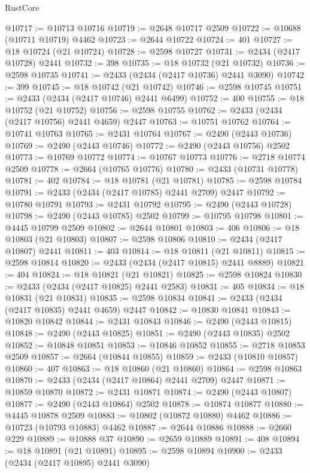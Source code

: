 \begin{lexlean}{RustCore}
\begin{coremodule}
@10717 := @10713 @10716
@10719 := @2648 @10717 @2509
@10722 := @10688 (@10711 @10719) @4462
@10723 := @2644 @10722
@10724 := 401
@10727 := @18 @10724 (@21 @10724)
@10728 := @2598 @10727
@10731 := @2434 (@2417 @10728) @2441
@10732 := 398
@10735 := @18 @10732 (@21 @10732)
@10736 := @2598 @10735
@10741 := @2433 (@2434 (@2417 @10736) @2441 @3090)
@10742 := 399
@10745 := @18 @10742 (@21 @10742)
@10746 := @2598 @10745
@10751 := @2433 (@2434 (@2417 @10746) @2441 @6499)
@10752 := 400
@10755 := @18 @10752 (@21 @10752)
@10756 := @2598 @10755
@10762 := @2433 (@2434 (@2417 @10756) @2441 @4659) @2447
@10763 := @10751 @10762
@10764 := @10741 @10763
@10765 := @2431 @10764
@10767 := @2490 (@2443 @10736)
@10769 := @2490 (@2443 @10746)
@10772 := @2490 (@2443 @10756) @2502
@10773 := @10769 @10772
@10774 := @10767 @10773
@10776 := @2718 @10774 @2509
@10778 := @2664 (@10765 @10776)
@10780 := @2433 (@10731 @10778)
@10781 := 402
@10784 := @18 @10781 (@21 @10781)
@10785 := @2598 @10784
@10791 := @2433 (@2434 (@2417 @10785) @2441 @2709) @2447
@10792 := @10780 @10791
@10793 := @2431 @10792
@10795 := @2490 (@2443 @10728)
@10798 := @2490 (@2443 @10785) @2502
@10799 := @10795 @10798
@10801 := @4445 @10799 @2509
@10802 := @2644 @10801
@10803 := 406
@10806 := @18 @10803 (@21 @10803)
@10807 := @2598 @10806
@10810 := @2434 (@2417 @10807) @2441
@10811 := 403
@10814 := @18 @10811 (@21 @10811)
@10815 := @2598 @10814
@10820 := @2433 (@2434 (@2417 @10815) @2441 @8889)
@10821 := 404
@10824 := @18 @10821 (@21 @10821)
@10825 := @2598 @10824
@10830 := @2433 (@2434 (@2417 @10825) @2441 @2583)
@10831 := 405
@10834 := @18 @10831 (@21 @10831)
@10835 := @2598 @10834
@10841 := @2433 (@2434 (@2417 @10835) @2441 @4659) @2447
@10842 := @10830 @10841
@10843 := @10820 @10842
@10844 := @2431 @10843
@10846 := @2490 (@2443 @10815)
@10848 := @2490 (@2443 @10825)
@10851 := @2490 (@2443 @10835) @2502
@10852 := @10848 @10851
@10853 := @10846 @10852
@10855 := @2718 @10853 @2509
@10857 := @2664 (@10844 @10855)
@10859 := @2433 (@10810 @10857)
@10860 := 407
@10863 := @18 @10860 (@21 @10860)
@10864 := @2598 @10863
@10870 := @2433 (@2434 (@2417 @10864) @2441 @2709) @2447
@10871 := @10859 @10870
@10872 := @2431 @10871
@10874 := @2490 (@2443 @10807)
@10877 := @2490 (@2443 @10864) @2502
@10878 := @10874 @10877
@10880 := @4445 @10878 @2509
@10883 := @10802 (@10872 @10880) @4462
@10886 := @10723 (@10793 @10883) @4462
@10887 := @2644 @10886
@10888 := @2660 @229
@10889 := @10888 @37
@10890 := @2659 @10889
@10891 := 408
@10894 := @18 @10891 (@21 @10891)
@10895 := @2598 @10894
@10900 := @2433 (@2434 (@2417 @10895) @2441 @3090)

\end{coremodule}
\end{lexlean}
